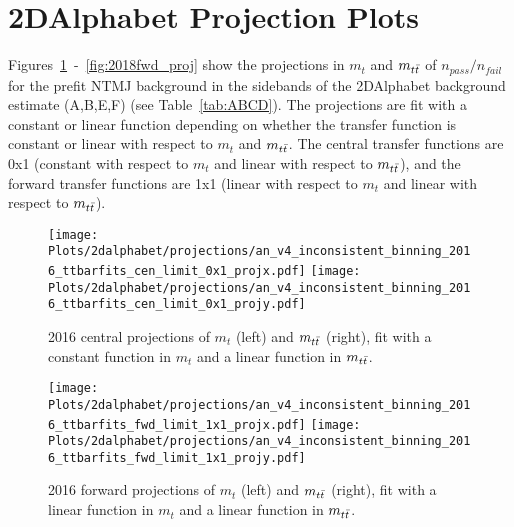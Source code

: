 \section{2DAlphabet Projection Plots}
\label{sec:appendix_2dalphabet}

Figures~\ref{fig:2016cen_proj}~-~\ref{fig:2018fwd_proj} show the projections in $m_t$ and $m_{t\bar{t}}$ of $n_{pass}/n_{fail}$ for the prefit NTMJ background in the sidebands of the 2DAlphabet background estimate (A,B,E,F) (see Table~\ref{tab:ABCD}). The projections are fit with a constant or linear function depending on whether the transfer function is constant or linear with respect to $m_t$ and $m_{t\bar{t}}$. The central transfer functions are 0x1 (constant with respect to $m_t$ and linear with respect to $m_{t\bar{t}}$), and the forward transfer functions are 1x1 (linear with respect to $m_t$ and linear with respect to $m_{t\bar{t}}$).

\begin{figure}[htp]
	\begin{center}
		
		\texttt{[image: Plots/2dalphabet/projections/an\_v4\_inconsistent\_binning\_2016\_ttbarfits\_cen\_limit\_0x1\_projx.pdf]}
		\texttt{[image: Plots/2dalphabet/projections/an\_v4\_inconsistent\_binning\_2016\_ttbarfits\_cen\_limit\_0x1\_projy.pdf]}
		\caption{2016 central projections of $m_t$ (left) and $m_{t\bar{t}}$ (right), fit with a constant function in $m_t$ and a linear function in $m_{t\bar{t}}$.}
		\label{fig:2016cen_proj}
	\end{center}
\end{figure}



\begin{figure}[htp]
	\begin{center}
		
		\texttt{[image: Plots/2dalphabet/projections/an\_v4\_inconsistent\_binning\_2016\_ttbarfits\_fwd\_limit\_1x1\_projx.pdf]}
		\texttt{[image: Plots/2dalphabet/projections/an\_v4\_inconsistent\_binning\_2016\_ttbarfits\_fwd\_limit\_1x1\_projy.pdf]}
		\caption{2016 forward projections of $m_t$ (left) and $m_{t\bar{t}}$ (right), fit with a linear function in $m_t$ and a linear function in $m_{t\bar{t}}$.}
		\label{fig:2016fwd_proj}
	\end{center}
\end{figure}





